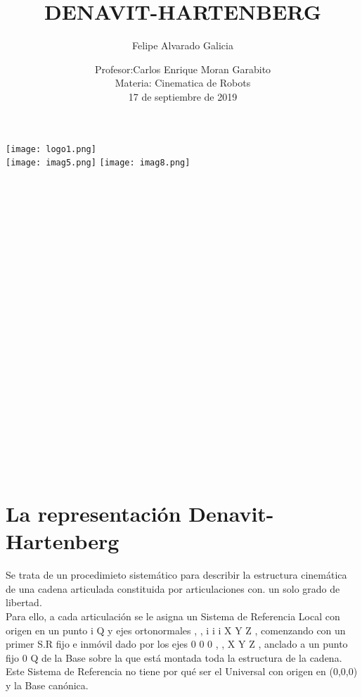 \documentclass[12pt,a4paper]{article}
\author{Felipe Alvarado Galicia}
\title{DENAVIT-HARTENBERG}
\date{Profesor:Carlos Enrique Moran Garabito\\
Materia: Cinematica de Robots\\
17 de septiembre de 2019}
\begin{document}
\maketitle
 \texttt{[image: logo1.png]}\\
\texttt{[image: imag5.png]} 
\texttt{[image: imag8.png]}\\\\\\\\\\\\\\\\\\\\\\\\\\\\\\\\\\\\\\\\\\\\\\

\tableofcontents

\section{La representación Denavit-Hartenberg
}
Se trata de un procedimieto sistemático para describir la estructura cinemática de una cadena articulada constituida por articulaciones con. un solo grado de libertad.\\
 Para ello, a cada articulación se le asigna un Sistema de Referencia Local con origen en un punto i Q y ejes ortonormales { } , , i i i X Y Z , comenzando con un primer S.R fijo e inmóvil dado por los ejes { } 0 0 0 , , X Y Z , anclado a un punto fijo 0 Q  de la Base sobre la que está montada toda la estructura de la cadena.\\
Este Sistema de Referencia no tiene por qué ser el Universal con origen en (0,0,0) y la Base canónica.
\end{document}
